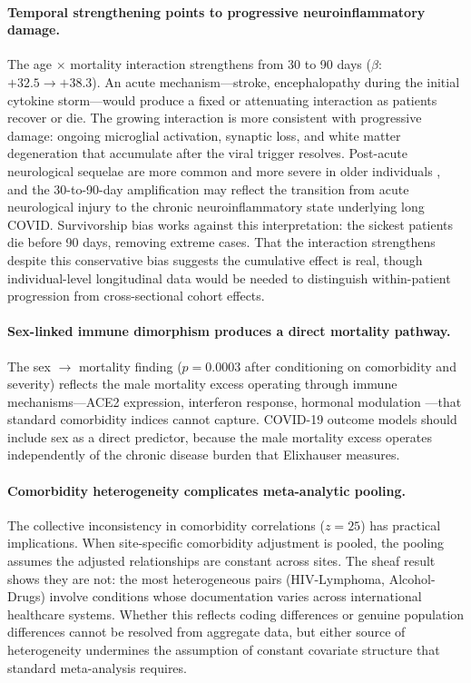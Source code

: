 \documentclass{article}
\begin{document}
\paragraph{Temporal strengthening points to progressive neuroinflammatory damage.}
The age $\times$ mortality interaction strengthens from 30 to 90 days ($\beta$: $+32.5 \to +38.3$).
An acute mechanism---stroke, encephalopathy during the initial cytokine storm---would produce a fixed or attenuating interaction as patients recover or die.
The growing interaction is more consistent with progressive damage: ongoing microglial activation, synaptic loss, and white matter degeneration that accumulate after the viral trigger resolves.
Post-acute neurological sequelae are more common and more severe in older individuals \cite{nalbandian2021pasc, taquet2021neuro}, and the 30-to-90-day amplification may reflect the transition from acute neurological injury to the chronic neuroinflammatory state underlying long COVID.
Survivorship bias works against this interpretation: the sickest patients die before 90 days, removing extreme cases.
That the interaction strengthens despite this conservative bias suggests the cumulative effect is real, though individual-level longitudinal data would be needed to distinguish within-patient progression from cross-sectional cohort effects.

\paragraph{Sex-linked immune dimorphism produces a direct mortality pathway.}
The sex $\to$ mortality finding ($p = 0.0003$ after conditioning on comorbidity and severity) reflects the male mortality excess operating through immune mechanisms---ACE2 expression, interferon response, hormonal modulation \cite{takahashi2020sex}---that standard comorbidity indices cannot capture.
COVID-19 outcome models should include sex as a direct predictor, because the male mortality excess operates independently of the chronic disease burden that Elixhauser measures.

\paragraph{Comorbidity heterogeneity complicates meta-analytic pooling.}
The collective inconsistency in comorbidity correlations ($z = 25$) has practical implications.
When site-specific comorbidity adjustment is pooled, the pooling assumes the adjusted relationships are constant across sites.
The sheaf result shows they are not: the most heterogeneous pairs (HIV-Lymphoma, Alcohol-Drugs) involve conditions whose documentation varies across international healthcare systems.
Whether this reflects coding differences or genuine population differences cannot be resolved from aggregate data, but either source of heterogeneity undermines the assumption of constant covariate structure that standard meta-analysis requires.
\end{document}
